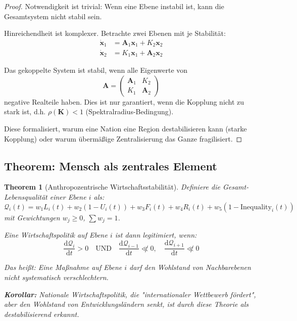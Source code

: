 \documentclass[a4paper, 12pt, twoside, openright]{report}
\newtheorem{theorem}{Theorem}[section]
\theoremstyle{definition}
\theoremstyle{definition}
\begin{document}
\begin{proof}
Notwendigkeit ist trivial: Wenn eine Ebene instabil ist, kann die Gesamtsystem nicht stabil sein.

Hinreichendheit ist komplexer. Betrachte zwei Ebenen mit je Stabilität:
\begin{align}
\dot{\mathbf{x}}_1 &= \mathbf{A}_1 \mathbf{x}_1 + K_2 \mathbf{x}_2 \\
\dot{\mathbf{x}}_2 &= K_1 \mathbf{x}_1 + \mathbf{A}_2 \mathbf{x}_2
\end{align}

Das gekoppelte System ist stabil, wenn alle Eigenwerte von
\begin{equation}
\mathbf{A} = \begin{pmatrix}
\mathbf{A}_1 & K_2 \\
K_1 & \mathbf{A}_2
\end{pmatrix}
\end{equation}
negative Realteile haben. Dies ist nur garantiert, wenn die Kopplung nicht zu stark ist, d.h. $\rho(\mathbf{K}) < 1$ (Spektralradius-Bedingung).

Diese formalisiert, warum eine Nation eine Region destabilisieren kann (starke Kopplung) oder warum übermäßige Zentralisierung das Ganze fragilisiert.
\end{proof}

\subsection{Theorem: Mensch als zentrales Element}

\begin{theorem}[Anthropozentrische Wirtschaftsstabilität]
\label{thm:anthropozentrismus}
Definiere die Gesamt-Lebensqualität einer Ebene $i$ als:
\begin{equation}
\mathcal{Q}_i(t) = w_1 L_i(t) + w_2 (1-U_i(t)) + w_3 F_i(t) + w_4 R_i(t) + w_5 (1-\text{Inequality}_i(t))
\end{equation}
mit Gewichtungen $w_j \geq 0$, $\sum w_j = 1$.

Eine Wirtschaftspolitik auf Ebene $i$ ist dann legitimiert, wenn:
\begin{equation}
\frac{\mathrm{d}\mathcal{Q}_i}{\mathrm{d}t} > 0 \quad \text{UND} \quad \frac{\mathrm{d}\mathcal{Q}_{i-1}}{\mathrm{d}t} \not\ll 0, \quad \frac{\mathrm{d}\mathcal{Q}_{i+1}}{\mathrm{d}t} \not\ll 0
\end{equation}

Das heißt: Eine Maßnahme auf Ebene $i$ darf den Wohlstand von Nachbarebenen nicht systematisch verschlechtern.

\textbf{Korollar:} Nationale Wirtschaftspolitik, die "internationaler Wettbewerb fördert", aber den Wohlstand von Entwicklungsländern senkt, ist durch diese Theorie als destabilisierend erkannt.
\end{theorem}
\end{document}
